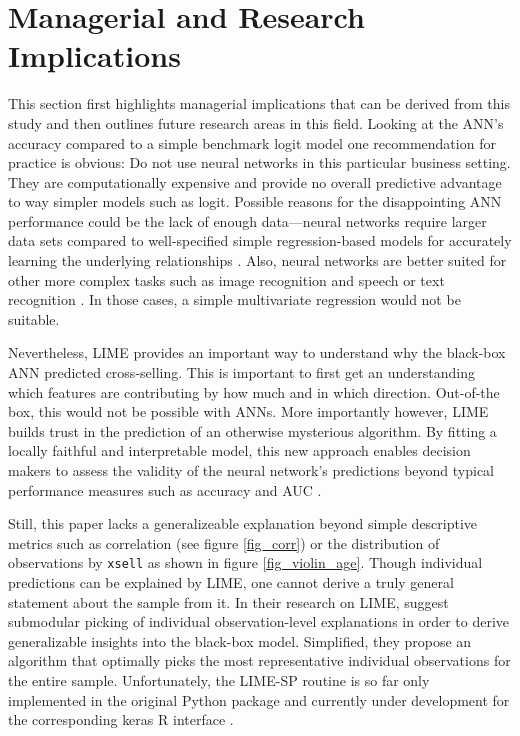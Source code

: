 \documentclass[12pt,a4paper]{article}
\newcommand{\pkg}[1]{{\normalfont\fontseries{b}\selectfont #1}}
\let\proglang=\textsf
\let\code=\texttt
\begin{document}
\section{Managerial and Research Implications} \label{sec_man_impl}
This section first highlights managerial implications that can be derived from this study and then outlines future research areas in this field.
Looking at the ANN's accuracy compared to a simple benchmark logit model one recommendation for practice is obvious:
Do not use neural networks in this particular business setting.
They are computationally expensive and provide no overall predictive advantage to way simpler models such as logit.
Possible reasons for the disappointing ANN performance could be the lack of enough data---neural networks require larger data sets compared
to well-specified simple regression-based models for accurately learning the underlying relationships \cite{chanClassifierDesignComputeraided1999}.
Also, neural networks are better suited for other more complex tasks such as image recognition \citep{estevaDermatologistlevelClassificationSkin2017} and speech \citep{hintonDeepNeuralNetworks2012} or text recognition \citep{jaderbergSyntheticDataArtificial2014}.
In those cases, a simple multivariate regression would not be suitable.

Nevertheless, LIME  provides an important way to understand why the black-box ANN predicted cross-selling.
This is important to first get an understanding which features are contributing by how much and in which direction.
Out-of-the box, this would not be possible with ANNs.
More importantly however, LIME builds trust in the prediction of an otherwise mysterious algorithm.
By fitting a locally faithful and interpretable model, this new approach enables decision makers to assess the validity of the neural network's 
predictions beyond typical performance measures such as accuracy and AUC \citep{ribeiroWhyShouldTrust2016a}.

Still, this paper lacks a generalizeable explanation beyond simple descriptive metrics such as correlation (see figure \ref{fig_corr}) or the distribution of observations by \code{xsell} as shown in figure \ref{fig_violin_age}.
Though individual predictions can be explained by LIME, one cannot derive a truly general statement about the sample from it.
In their research on LIME, \cite{ribeiroWhyShouldTrust2016a} suggest submodular picking of individual observation-level explanations in order to 
derive generalizable insights into the black-box model.
Simplified, they propose an algorithm that optimally picks the most representative individual observations for the entire sample.
Unfortunately, the LIME-SP routine is so far only implemented in the original \proglang{Python} package and currently under development for the corresponding  \pkg{keras} \proglang{R} interface \citep{kavickyLocalInterpretableModelAgnostic2017}. 
\end{document}
